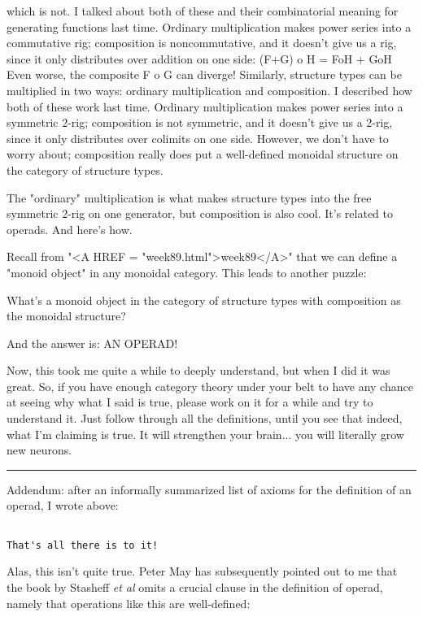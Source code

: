 which is not.  I talked about both of these and their combinatorial 
meaning for generating functions last time.  Ordinary multiplication
makes power series into a commutative rig; composition is
noncommutative, and it doesn't give us a rig, since it only distributes 
over addition on one side:
(F+G) o H = FoH + GoH
Even worse, the composite F o G can diverge!
Similarly, structure types can be multiplied in two ways:
ordinary multiplication and composition.  I described how both
of these work last time.  Ordinary multiplication makes power 
series into a symmetric 2-rig; composition is not symmetric, and 
it doesn't give us a 2-rig, since it only distributes over
colimits on one side.  However, we
don't have to worry about; composition really does put
a well-defined monoidal structure on the category of structure types.

The "ordinary" multiplication is what makes structure types into
the free symmetric 2-rig on one generator, but composition is also
cool.  It's related to operads.  And here's how.

Recall from "<A HREF = "week89.html">week89</A>" that we can define a "monoid object" in any
monoidal category.  This leads to another puzzle:

What's a monoid object in the category of structure types 
with composition as the monoidal structure?  

And the answer is: AN OPERAD!

Now, this took me quite a while to deeply understand, but when I did it 
was great.   So, if you have enough category theory under your belt to 
have any chance at seeing why what I said is true, please work on it for 
a while and try to understand it.  Just follow through all the definitions, 
until you see that indeed, what I'm claiming is true.  It will strengthen 
your brain... you will literally grow new neurons.  

\par\noindent\rule{\textwidth}{0.4pt}
Addendum: after an informally summarized list of axioms for the
definition of an operad, I wrote above:

\begin{verbatim}

That's all there is to it!
\end{verbatim}
    
Alas, this isn't quite true.  Peter May has subsequently pointed out to me 
that the book by Stasheff \emph{et al}
omits a crucial clause in the definition of operad,
namely that operations like this are well-defined:


